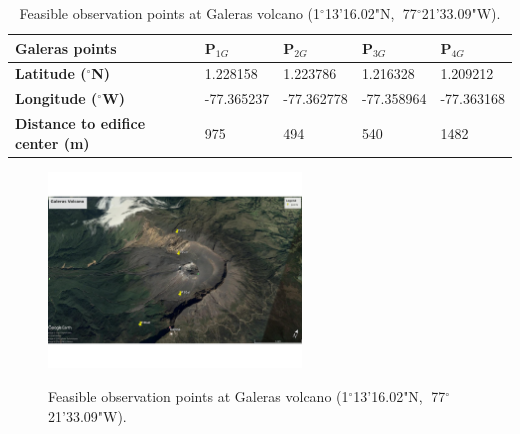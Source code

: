 \documentclass[letterpaper,10pt,titlepage,linenumber]{article}
\begin{document}
\label{GaleraObservationPoints}
\begin{table}[!ht]
\centering
\begin{tabular}{lllll}
\hline
\textbf{Galeras points}        & \textbf{P$_{1G}$}& \textbf{P$_{2G}$} & \textbf{P$_{3G}$} & \textbf{P$_{4G}$} \\ \hline
\textbf{Latitude  ($^{\circ}$N)}    & 1.228158           & 1.223786         & 1.216328        & 1.209212     \\
\textbf{Longitude ($^{\circ}$W)}    & -77.365237         & -77.362778       & -77.358964       & -77.363168    \\
\textbf{Distance to edifice center (m)} & 975              & 494              & 540              & 1482       \\ 
\hline
\end{tabular}
	\caption{Feasible observation points at Galeras volcano (1$^{\circ}$13'16.02"N,$\;$ 77$^{\circ}$21'33.09"W). }
\label{TableGaleras}
\end{table}


\begin{figure}[!ht]
\centering
{\includegraphics[width=0.6\textwidth]{Figures/galeraspoints}}
	\caption{Feasible observation points at Galeras volcano (1$^{\circ}$13'16.02"N,$\;$ 77$^{\circ}$21'33.09"W).} 
  \label{galerasgeo}
\end{figure}
\end{document}
